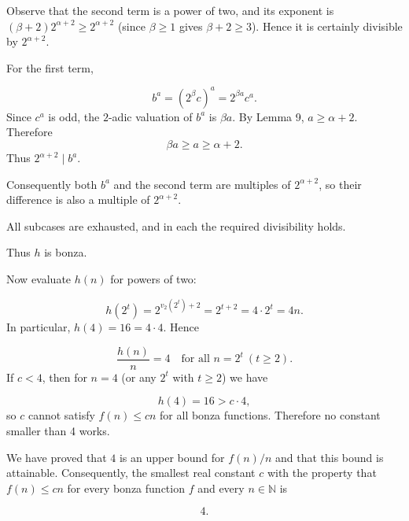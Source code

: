 Observe that the second term is a power of two, and its exponent is \((\beta+2)2^{\alpha+2} \ge 2^{\alpha+2}\) (since \(\beta\ge1\) gives \(\beta+2\ge3\)). Hence it is certainly divisible by \(2^{\alpha+2}\).\par
For the first term,\par
\[
b^{a} = (2^{\beta}c)^{a} = 2^{\beta a} c^{a}.
\]
Since \(c^{a}\) is odd, the \(2\)-adic valuation of \(b^{a}\) is \(\beta a\). By Lemma 9, \(a \ge \alpha+2\). Therefore
\[
    \beta a \ge a \ge \alpha+2.
    \]
Thus \(2^{\alpha+2} \mid b^{a}\).\par
Consequently both \(b^{a}\) and the second term are multiples of \(2^{\alpha+2}\), so their difference is also a multiple of \(2^{\alpha+2}\).\par
All subcases are exhausted, and in each the required divisibility holds.\par
\smallskip
Thus \(h\) is bonza.\par
Now evaluate \(h(n)\) for powers of two:\par
{}
\[
h(2^{t}) = 2^{v_{2}(2^{t})+2} = 2^{t+2} = 4\cdot 2^{t} = 4n.
\]
In particular, \(h(4)=16 = 4\cdot4\). Hence\par
\[
\frac{h(n)}{n} = 4 \quad\text{for all } n=2^{t}\ (t\ge2).
\]
If \(c<4\), then for \(n=4\) (or any \(2^{t}\) with \(t\ge2\)) we have\par
\[
h(4) = 16 > c\cdot 4,
\]
so \(c\) cannot satisfy \(f(n)\le cn\) for all bonza functions. Therefore no constant smaller than 4 works.\par
\smallskip
{}
We have proved that \(4\) is an upper bound for \(f(n)/n\) and that this bound is attainable. Consequently, the smallest real constant \(c\) with the property that \(f(n)\le cn\) for every bonza function \(f\) and every \(n\in\mathbb N\) is\par
\[
\boxed{4}.
\]
\par
